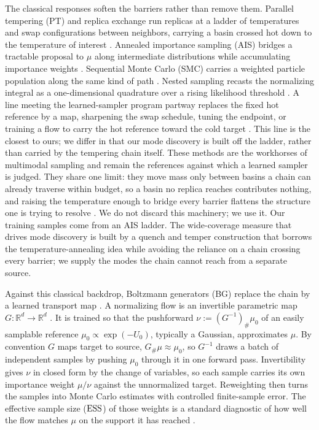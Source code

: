 \documentclass{article}
\begin{document}
The classical responses soften the barriers rather than remove them. Parallel tempering (PT) and replica exchange run replicas at a ladder of temperatures and swap configurations between neighbors, carrying a basin crossed hot down to the temperature of interest \citep{swendsen1986replica,geyer1991markov,hukushima1996exchange}. Annealed importance sampling (AIS) bridges a tractable proposal to $\mu$ along intermediate distributions while accumulating importance weights \citep{neal2001annealed}. Sequential Monte Carlo (SMC) carries a weighted particle population along the same kind of path \citep{doucet2001introduction,delmoral2006sequential}. Nested sampling recasts the normalizing integral as a one-dimensional quadrature over a rising likelihood threshold \citep{skilling2006nested}. A line meeting the learned-sampler program partway replaces the fixed hot reference by a map, sharpening the swap schedule, tuning the endpoint, or training a flow to carry the hot reference toward the cold target \citep{syed2022nonreversible,surjanovic2022variational,zhang2025accelerated}. This line is the closest to ours; we differ in that our mode discovery is built off the ladder, rather than carried by the tempering chain itself. These methods are the workhorses of multimodal sampling and remain the references against which a learned sampler is judged. They share one limit: they move mass only between basins a chain can already traverse within budget, so a basin no replica reaches contributes nothing, and raising the temperature enough to bridge every barrier flattens the structure one is trying to resolve \citep{woodard2009conditions,chehab2024provable}. We do not discard this machinery; we use it. Our training samples come from an AIS ladder. The wide-coverage measure that drives mode discovery is built by a quench and temper construction that borrows the temperature-annealing idea while avoiding the reliance on a chain crossing every barrier; we supply the modes the chain cannot reach from a separate source.

Against this classical backdrop, Boltzmann generators (BG) replace the chain by a learned transport map \citep{noe2019boltzmann}. A normalizing flow is an invertible parametric map $G:\mathbb R^d\to\mathbb R^d$ \citep{rezende2015variational,papamakarios2017masked,kingma2018glow}. It is trained so that the pushforward $\nu := (G^{-1})_{\#}\mu_0$ of an easily samplable reference $\mu_0 \propto \exp(-U_0)$, typically a Gaussian, approximates $\mu$. By convention $G$ maps target to source, $G_{\#}\mu\approx\mu_0$, so $G^{-1}$ draws a batch of independent samples by pushing $\mu_0$ through it in one forward pass. Invertibility gives $\nu$ in closed form by the change of variables, so each sample carries its own importance weight $\mu/\nu$ against the unnormalized target. Reweighting then turns the samples into Monte Carlo estimates with controlled finite-sample error. The effective sample size ($\mathrm{ESS}$) of those weights is a standard diagnostic of how well the flow matches $\mu$ on the support it has reached \citep{liu2001monte,doucet2001introduction,martino2017rethinking}.
\end{document}
